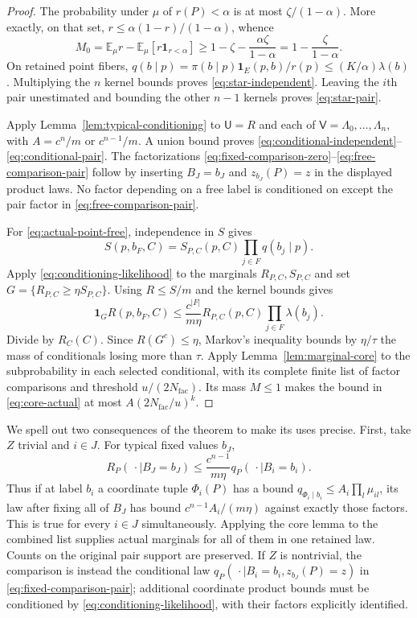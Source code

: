 \begin{proof}
The probability under $\mu$ of $r(P)<\alpha$ is at most
$\zeta/(1-\alpha)$.  More exactly, on that set,
$r\le\alpha(1-r)/(1-\alpha)$, whence
\[
 M_0=\mathbb E_\mu r-\mathbb E_\mu[r\boldsymbol1_{r<\alpha}]
 \ge1-\zeta-\frac{\alpha\zeta}{1-\alpha}
 =1-\frac{\zeta}{1-\alpha}.
\]
On retained point fibers,
$q(b\mid p)=\pi(b\mid p)\boldsymbol1_E(p,b)/r(p)
\le(K/\alpha)\lambda(b)$.
Multiplying the $n$ kernel bounds proves
\eqref{eq:star-independent}.  Leaving the $i$th pair unestimated and
bounding the other $n-1$ kernels proves \eqref{eq:star-pair}.

Apply Lemma~\ref{lem:typical-conditioning} to $\mathsf U=R$ and each of
$\mathsf V=\Lambda_0,\ldots,\Lambda_n$, with
$A=c^n/m$ or $c^{n-1}/m$.  A union bound proves
\eqref{eq:conditional-independent}--\eqref{eq:conditional-pair}.
The factorizations
\eqref{eq:fixed-comparison-zero}--\eqref{eq:free-comparison-pair}
follow by inserting $B_J=b_J$ and $z_{b_J}(P)=z$ in the displayed
product laws.  No factor depending on a free label is conditioned
on except the pair factor in \eqref{eq:free-comparison-pair}.

For \eqref{eq:actual-point-free}, independence in $S$ gives
\[
 S(p,b_F,C)=S_{P,C}(p,C)\prod_{j\in F}q(b_j\mid p).
\]
Apply \eqref{eq:conditioning-likelihood} to the marginals
$R_{P,C},S_{P,C}$ and set
$G=\{R_{P,C}\ge\eta S_{P,C}\}$.
Using $R\le S/m$ and the kernel bounds gives
\[
 \boldsymbol1_G R(p,b_F,C)
 \le\frac{c^{|F|}}{m\eta}R_{P,C}(p,C)
                                   \prod_{j\in F}\lambda(b_j).
\]
Divide by $R_C(C)$.  Since $R(G^c)\le\eta$, Markov's inequality
bounds by $\eta/\tau$ the mass of conditionals losing more than
$\tau$.  Apply Lemma~\ref{lem:marginal-core} to the subprobability in each
selected conditional, with its complete finite list of factor
comparisons and threshold $u/(2N_{\mathrm{fac}})$.  Its mass $M\le1$
makes the bound in \eqref{eq:core-actual} at most
$A(2N_{\mathrm{fac}}/u)^k$.
\end{proof}

We spell out two consequences of the theorem to make its uses precise.
First, take $Z$ trivial and $i\in J$.  For typical fixed values $b_J$,
\begin{equation}
 R_P(\,\cdot\mid B_J=b_J)
       \le\frac{c^{n-1}}{m\eta}q_P(\,\cdot\mid B_i=b_i).
 \label{eq:fixed-pair-inheritance}
\end{equation}
Thus if at label $b_i$ a coordinate tuple $\Phi_i(P)$ has a bound
$q_{\Phi_i\mid b_i}\le A_i\prod_l\mu_{il}$, its law after fixing
all of $B_J$ has bound
$c^{n-1}A_i/(m\eta)$ against exactly those factors.
This is true for every $i\in J$ simultaneously.  Applying the core
lemma to the combined list supplies actual marginals for all of them
in one retained law.  Counts on the original pair support are preserved.
If $Z$ is nontrivial, the comparison is instead the conditional law
$q_P(\,\cdot\mid B_i=b_i,z_{b_J}(P)=z)$ in
\eqref{eq:fixed-comparison-pair}; additional coordinate product
bounds must be conditioned by \eqref{eq:conditioning-likelihood},
with their factors explicitly identified.

